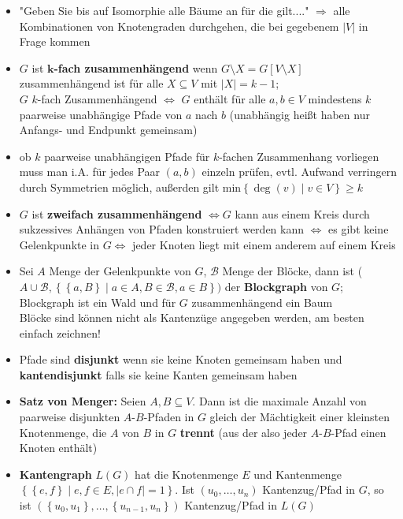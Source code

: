 \documentclass[10pt,a4paper]{article}
\begin{document}
\begin{itemize}
\item "Geben Sie bis auf Isomorphie alle Bäume an für die gilt...." $\Rightarrow$ alle Kombinationen von Knotengraden durchgehen, die bei gegebenem $\vert V\vert$ in Frage kommen 
\item $G$ ist $\boldsymbol{k}$\textbf{-fach zusammenhängend} wenn $G\setminus X=G[V\setminus X]$ zusammenhängend ist für alle $X\subseteq V$ mit $\vert X\vert=k -1$;\\ 
$G$ $k$-fach Zusammenhängend $\Leftrightarrow$ $G$ enthält für alle $a,b\in V$ mindestens $k$ paarweise unabhängige Pfade von $a$ nach $b$ (unabhängig heißt haben nur Anfangs- und Endpunkt gemeinsam)
\item ob $k$ paarweise unabhängigen Pfade für $k$-fachen Zusammenhang vorliegen muss man i.A. für jedes Paar $(a,b)$ einzeln prüfen, evtl. Aufwand verringern durch Symmetrien möglich, außerden gilt min$\left\lbrace \deg(v)\mid v\in V\right\rbrace \geq k$
\item $G$ ist \textbf{zweifach zusammenhängend}  $\Leftrightarrow G$ kann aus einem Kreis durch sukzessives Anhängen von Pfaden konstruiert werden kann $\Leftrightarrow$ es gibt keine Gelenkpunkte in $G\Leftrightarrow$ jeder Knoten liegt mit einem anderem auf einem Kreis 
\item Sei $A$ Menge der Gelenkpunkte von $G$, $\mathcal{B}$ Menge der Blöcke, dann ist ($A\cup \mathcal{B}, \left\lbrace \left\lbrace a, B\right\rbrace \mid a\in A, B\in \mathcal{B}, a\in B\right\rbrace)$ der \textbf{Blockgraph} von $G$; Blockgraph ist ein Wald und  für $G$ zusammenhängend ein Baum\\
Blöcke sind können nicht als Kantenzüge angegeben werden, am besten einfach zeichnen!
\item Pfade sind \textbf{disjunkt} wenn sie keine Knoten gemeinsam haben und \textbf{kantendisjunkt} falls sie keine Kanten gemeinsam haben
\item \textbf{Satz von Menger:} Seien $A,B\subseteq V$. Dann ist die maximale Anzahl von paarweise disjunkten $A$-$B$-Pfaden in $G$ gleich der Mächtigkeit einer kleinsten Knotenmenge, die $A$ von $B$ in $G$ \textbf{trennt} (aus der also jeder $A$-$B$-Pfad einen Knoten enthält)
\item \textbf{Kantengraph} $L(G)$ hat die Knotenmenge $E$ und Kantenmenge $\left\lbrace \left\lbrace e,f \right\rbrace \mid e,f \in E, \vert e \cap f\vert =1\right\rbrace$. Ist $(u_{0},\dotsc, u_{n})$ Kantenzug/Pfad in $G$, so ist $(\left\lbrace  u_{0},u_{1}\right\rbrace,\dotsc, \left\lbrace u_{n-1},u_{n}\right\rbrace)$ Kantenzug/Pfad in $L(G)$

\end{itemize}
\end{document}
